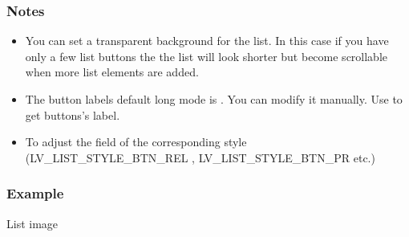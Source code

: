 \documentclass[letterpaper,10pt,english]{sphinxmanual}
\begin{document}
\subsubsection{Notes}
\label{\detokenize{object-types/list:notes}}\begin{itemize}
\item {} 
You can set a transparent background for the list. In this case if you have only a few list buttons the the list will look shorter but become scrollable when more list elements are added.

\item {} 
The button labels default long mode is . You can modify it manually. Use  to get buttons’s label.

\item {} 
To  adjust the  field of the corresponding style (LV\_LIST\_STYLE\_BTN\_REL , LV\_LIST\_STYLE\_BTN\_PR etc.)

\end{itemize}


\subsubsection{Example}
\label{\detokenize{object-types/list:example}}
List image
\end{document}
